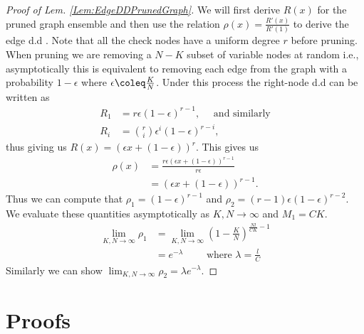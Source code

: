 \documentclass[conference,twocolumn]{IEEEtran}
\begin{document}
\begin{proof}[Proof of Lem. \ref{Lem:EdgeDDPrunedGraph}]
We will first derive $R(x)$ for the pruned graph ensemble and then use the relation\cite{richardson2008modern} $\rho(x)=\frac{R'(x)}{R'(1)}$ to derive the edge d.d . Note that all the check nodes have a uniform degree $r$ before pruning. When pruning we are removing a $N-K$ subset of variable nodes at random i.e., asymptotically this is equivalent to removing each edge from the graph with a probability $1-\epsilon$ where $\epsilon\coleq \frac{K}{N}$. Under this process the right-node d.d can be written as
\begin{align*}
R_1&=r\epsilon(1-\epsilon)^{r-1},\quad \text{ and similarly}\\
R_i &=\binom{r}{i} \epsilon^{i}(1-\epsilon)^{r-i},
\end{align*}
thus giving us $R(x)=(\epsilon x+(1-\epsilon))^{r}$. This gives us 
\begin{align*}
\rho(x)&=\frac{r\epsilon(\epsilon x+(1-\epsilon))^{r-1}}{r\epsilon}\\
          &=(\epsilon x+(1-\epsilon))^{r-1}.
\end{align*}
Thus we can compute that $\rho_1=(1-\epsilon)^{r-1}$ and $\rho_2=(r-1)\epsilon(1-\epsilon)^{r-2}$. We evaluate these quantities asymptotically as $K,N\rightarrow \infty$ and $M_1=CK$.
\begin{align*}
\lim_{K,N\rightarrow \infty} \rho_1&=\lim_{K,N\rightarrow \infty} (1-\frac{K}{N})^{\frac{Nl}{CK}-1}\\
&=e^{-\lambda} \qquad \text{ where } \lambda=\frac{l}{C}
\end{align*}
Similarly we can show $\lim_{K,N\rightarrow \infty}\rho_2=\lambda e^{-\lambda}$.
\end{proof}


\section{Proofs}


\end{document}
